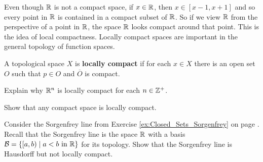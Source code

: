 \item Even though $\mathbb{R}$ is not a compact space, if $x \in \mathbb{R}$, then $x \in [x-1, x+1]$ and so every point in $\mathbb{R}$ is contained in a compact subset of $\mathbb{R}$. So if we view $\mathbb{R}$ from the perspective of a point in $\mathbb{R}$, the space $\mathbb{R}$ looks compact around that point. This is the idea of local compactness. Locally compact spaces are important in the general topology of function spaces.

\begin{definition} A topological space $X$ is \textbf{locally compact} if for each $x \in X$ there is an open set $O$ such that $p \in O$ and $\overline{O}$ is compact. 
\end{definition}

\ba

\item Explain why $\mathbb{R}^n$ is locally compact for each $n \in \mathbb{Z}^+$. 

\item Show that any compact space is locally compact.

\item Consider the Sorgenfrey line from Exercise \ref{ex:Closed_Sets_Sorgenfrey} on page \pageref{ex:Closed_Sets_Sorgenfrey}. Recall that the Sorgenfrey line is the space $\mathbb{R}$ with a basis $\mathcal{B} =  \{[a,b) \mid a < b \text{ in } \mathbb{R}\}$ for its topology. Show that the Sorgenfrey line is Hausdorff but not locally compact. 

\ea

